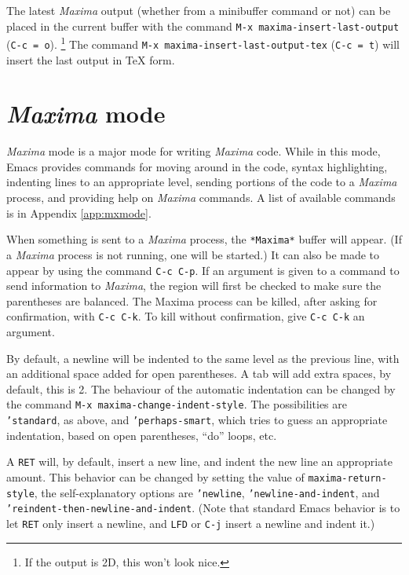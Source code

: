 \documentclass{article}
\newcommand{\mx}{\textsl{\sffamily Maxima}}
\newcommand{\hyph}{-\hspace{0pt}}
\begin{document}
The latest \mx{} output (whether from a minibuffer command or not) can
be placed in the current buffer with the command
\texttt{M-x maxima\hyph{}insert\hyph{}last\hyph{}output} (\texttt{C-c = o}).%
\footnote{If the output is 2D, this won't look nice.}
The command \texttt{M-x maxima\hyph{}insert\hyph{}last\hyph{}output\hyph{}tex} (\texttt{C-c = t})
will insert the last output in \TeX{} form.

\section{\mx{} mode}

\mx{} mode is a major mode for writing \mx{} code.  While in this
mode, Emacs provides commands for moving around in the code, syntax
highlighting, indenting lines to an appropriate level, sending
portions of the code to a \mx{} process, and providing help on \mx{}
commands.  A list of available commands is in Appendix
\ref{app:mxmode}.

When something is sent to a \mx{} process, the \texttt{*Maxima*}
buffer will
appear.  (If a \mx{} process is not running, one will be started.)  It
can also be made to appear by using the command \texttt{C-c C-p}.  If
an argument is given to a command to send information to \mx{}, the
region will first be checked to make sure the parentheses are
balanced.  The Maxima process can be killed, after asking for
confirmation, with \texttt{C-c C-k}.  To kill without confirmation, give
\texttt{C-c C-k} an argument.

By default, a newline will be indented to the same level as the
previous line, with an additional space added for open parentheses.  A
tab will add extra spaces, by default, this is 2.  The behaviour of
the automatic indentation can be changed by the command 
\texttt{M-x maxima\hyph{}change\hyph{}indent\hyph{}style}.  The possibilities are
\texttt{'standard}, as above, and \texttt{'perhaps\hyph{}smart}, which tries
to guess an appropriate indentation, based on open parentheses, ``do''
loops, etc.

A \texttt{RET} will, by default, insert a new line, and indent the new
line an appropriate amount.  This behavior can be changed by setting
the value of
\texttt{maxima\hyph{}return\hyph{}style}, the self-explanatory options are
\texttt{'newline},
 \texttt{'newline\hyph{}and\hyph{}indent}, and
\texttt{'reindent\hyph{}then\hyph{}newline\hyph{}and\hyph{}indent}.  (Note that standard Emacs
behavior is to let \texttt{RET} only insert a newline, and
\texttt{LFD} or \texttt{C-j} insert a newline and indent it.)
\end{document}

